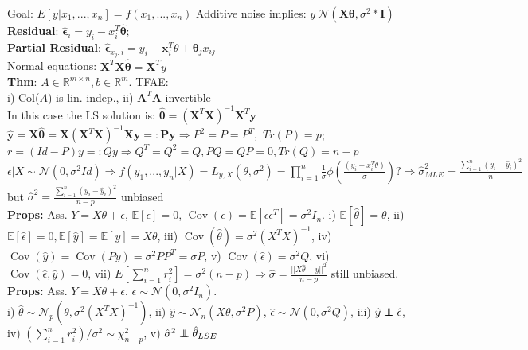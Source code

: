\documentclass[11pt]{article}
\newcommand{\bv}[1]{\mathbf{#1}}
\newcommand{\est}[1]{\mathbf{\hat{#1}}}
\newcommand{\R}{\mathbb{R}}
\newcommand{\E}{\mathbb{E}}
\newcommand\independent{\protect\mathpalette{\protect\independenT}{\perp}}
\def\independenT#1#2{\mathrel{\rlap{$#1#2$}\mkern2mu{#1#2}}}
\DeclareMathOperator*{\cov}{Cov}
\begin{document}
\begin{multicols}{4}

Goal: $E[y|x_1,...,x_n]=f(x_1,...,x_n)$
Additive noise implies: $y~\mathcal{N}(\bv{X\theta},\sigma^2*\bv{I})$\\
\textbf{Residual}: $\est{\epsilon}_i=y_i-x_i^T\est{\theta}$;\\
\textbf{Partial Residual}: $\est{\epsilon}_{x_j,i}=y_i-\bv{x}_i^T\theta+\bv{\theta}_j x_{ij}$\\
Normal equations: $\bv{X}^T\bv{X}\est{\theta}=\bv{X}^Ty$\\
\textbf{Thm}: $A\in\R^{m\times n}, b\in\R^m$. TFAE:\\
i) Col($A$) is lin. indep., ii) $\bv{A}^T\bv{A}$ invertible\\
In this case the LS solution is: $\est{\theta}=(\bv{X}^T \bv{X})^{-1}\bv{X}^T\bv{y}$\\
$\est{y}=\bv{X}\est{\theta}=\bv{X}(\bv{X}^T\bv{X})^{-1}\bv{X}\bv{y}=:\bv{P}\bv{y}\Rightarrow P^2=P=P^T,$ $Tr(P)=p$; $r=(Id-P)y=:Qy\Rightarrow Q^T=Q^2=Q,PQ=QP=0,Tr(Q)=n-p$\\

$\epsilon|X\sim\mathcal{N}(0,\sigma^2Id)\Rightarrow f(y_1,...,y_n|X)=L_{y,X}(\theta,\sigma^2)=\prod^n_{i=1}\frac{1}{\sigma}\phi(\frac{(y_i-x_i^T\theta)}{\sigma})? \Rightarrow \hat{\sigma}^2_{MLE}=\frac{\sum^n_{i=1}(y_i-\hat{y}_i)^2}{n}$ but $\hat{\sigma}^2=\frac{\sum^n_{i=1}(y_i-\hat{y}_i)^2}{n-p}$ unbiased\\

\textbf{Props:} Ass. $Y=X\theta+\epsilon$, $\E[\epsilon]=0$, $\cov(\epsilon)=\E[\epsilon\epsilon^T]=\sigma^2I_n$.
i) $\E[\hat{\theta}]=\theta$, ii) $\E[\hat{\epsilon}]=0,\E[\hat{y}]=\E[y]=X\theta$, iii) $\cov(\hat{\theta})=\sigma^2(X^TX)^{-1}$, iv) $\cov(\hat{y})=\cov(Py)=\sigma^2 PP^T=\sigma P$, v) $\cov(\hat{\epsilon})=\sigma^2Q$, vi) $\cov(\hat{\epsilon},\hat{y})=0$, vii) $E[\sum^n_{i=1} r_i^2]=\sigma^2(n-p)\Rightarrow\hat{\sigma}=\frac{||X\hat{\theta}-y||^2}{n-p}$ still unbiased.\\
\textbf{Props:} Ass. $Y=X\theta+\epsilon$, $\epsilon\sim\mathcal{N}(0,\sigma^2I_n)$.\\ i) $\hat{\theta}\sim\mathcal{N}_p(\theta,\sigma^2(X^TX)^{-1})$, ii) $\hat{y}\sim\mathcal{N}_n(X\theta,\sigma^2P)$, $\hat{\epsilon}\sim \mathcal{N}(0,\sigma^2Q)$, iii) $\hat{y}\independent \hat{\epsilon}$, iv) $(\sum^n_{i=1}r_i^2)/\sigma^2\sim\chi^2_{n-p}$, v) $\hat{\sigma}^2\independent \hat{\theta}_{LSE}$\\


\end{multicols}
\end{document}
